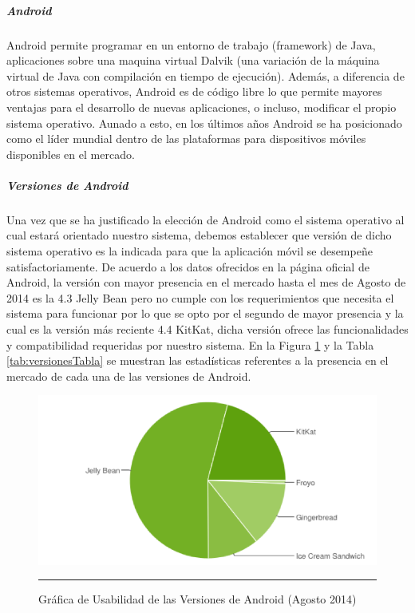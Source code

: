 \subparagraph{Android}

Android permite programar en un entorno de trabajo (framework) de Java, aplicaciones sobre una maquina virtual Dalvik (una variación de la máquina virtual de Java con compilación en tiempo de ejecución). Además, a diferencia de otros sistemas operativos, Android es de código libre lo que permite mayores ventajas para el desarrollo de nuevas aplicaciones, o incluso, modificar el propio sistema operativo. Aunado a esto, en los últimos años Android se ha posicionado como el líder mundial dentro de las plataformas para dispositivos móviles disponibles en el mercado. \cite{Android}

\subparagraph{Versiones de Android}

Una vez que se ha justificado la elección de Android como el sistema operativo al cual estará orientado nuestro sistema, debemos establecer que versión de dicho sistema operativo es la indicada para que la aplicación móvil se desempeñe satisfactoriamente. De acuerdo a los datos ofrecidos en la página oficial de Android, la versión con mayor presencia en el mercado hasta el mes de Agosto de 2014 es la 4.3 Jelly Bean pero no cumple con los requerimientos que necesita el sistema para funcionar por lo que se opto por el segundo de mayor presencia y la cual es la versión más reciente 4.4 KitKat, dicha versión ofrece las funcionalidades y compatibilidad requeridas por nuestro sistema. En la Figura \ref{fig:versionesFigura} y la Tabla \ref{tab:versionesTabla} se muestran las estadísticas referentes a la presencia en el mercado de cada una de las versiones de Android.

\begin{figure}[htbp]
	\centering
		\includegraphics[width=1\textwidth]{Figuras/versionesAndroid.png}
		\rule{30em}{0.5pt}
	\caption[Gráfica de Usabilidad de las Versiones de Android]{Gráfica de Usabilidad de las Versiones de Android (Agosto 2014) \cite{devAndroid}}
	\label{fig:versionesFigura}
\end{figure}

